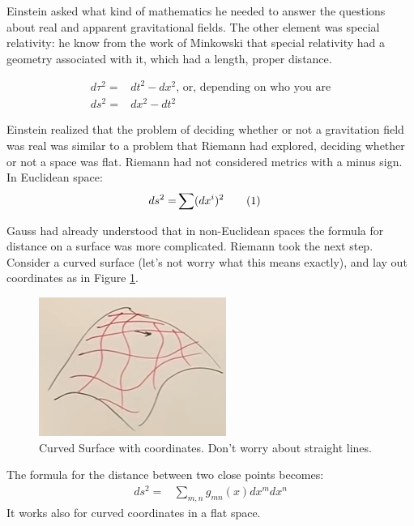 \documentclass[]{article}
\newcommand\numberthis{\addtocounter{equation}{1}\tag{\theequation}}
\begin{document}
Einstein asked what kind of mathematics he needed to answer the questions about real and apparent gravitational fields. The other element was special relativity: he know from the work of Minkowski that special relativity had a geometry associated with it, which had a length, proper distance.

\begin{align*}
	d\tau^2 =& dt^2 - dx^2 \text{, or, depending on who you are}\\
	ds^2 =& dx^2 -dt^2
\end{align*}

Einstein realized that the problem of deciding whether or not a gravitation field was real was similar to a problem that Riemann had explored, deciding whether or not a space was flat. Riemann had not considered metrics with a minus sign. In Euclidean space:
\begin{align*}
	ds^2 =& \sum (dx^i)^2 \numberthis \label{eq:euclidean:metric}
\end{align*}
 
Gauss had already understood that in non-Euclidean spaces the formula for distance on a surface was more complicated. Riemann took the next step. Consider a curved surface (let's not worry what this means exactly), and lay out coordinates as in Figure \ref{fig:gr-1-curved-surface-coordinates}.
 
\begin{figure}[H]
	\begin{center}
		\caption[Curved Surface with coordinates]{Curved Surface with coordinates. Don't worry about straight lines.}\label{fig:gr-1-curved-surface-coordinates}
		\includegraphics{gr-1-curved-surface-coordinates}
	\end{center}
\end{figure} 

The formula for the distance between two close points becomes:
\begin{align*}
	ds^2 =& \sum_{m,n} g_{mn}(x) dx^m dx^n
\end{align*}
It works also for curved coordinates in a flat space.
\end{document}
